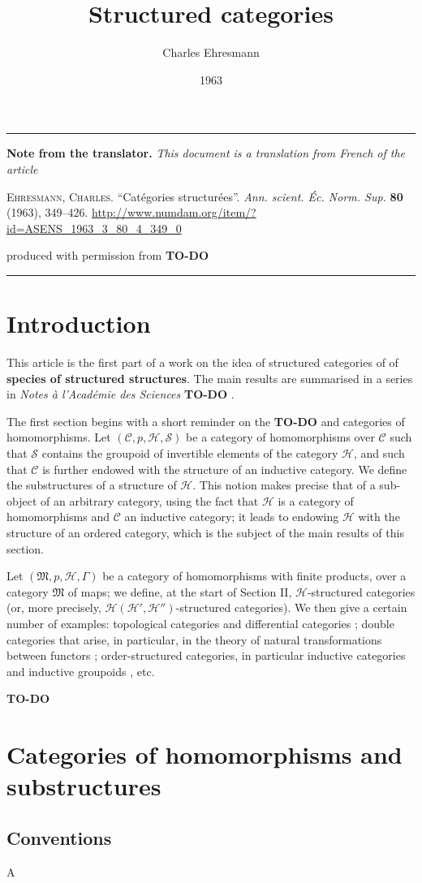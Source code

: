 \documentclass{article}
\title{Structured categories}
\author{Charles Ehresmann}
\date{1963}
\newcommand{\origcit}{%
  \textsc{Ehresmann, Charles.}
  ``Catégories structurées''.
  \emph{Ann. scient. Éc. Norm. Sup.} \textbf{80} (1963), 349--426.
  \url{http://www.numdam.org/item/?id=ASENS_1963_3_80_4_349_0}
}
\newenvironment{itenv}[1]
  {\phantomsection\par\medskip\noindent\textbf{#1.}\itshape}
  {\par\medskip}
\newcommand{\oldpage}[1]{\marginpar{\footnotesize$\Big\vert$ \textit{p.~#1}}}
\newcommand{\todo}{{\color{purple}\textbf{TO-DO }}}
\newcommand{\unsure}[1]{{\color{purple}\textbf{#1}}}
\newcommand{\CC}{\mathcal{C}}
\newcommand{\HH}{\mathcal{H}}
\renewcommand{\SS}{\mathcal{S}}
\newcommand{\MM}{\mathfrak{M}}
\begin{document}
\maketitle

\hrule
\begin{itenv}{Note from the translator}
This document is a translation from French of the article

\medskip
{\normalfont\origcit}

\medskip
produced with permission from \todo
\end{itenv}
\hrule

\tableofcontents


\section*{Introduction}

\oldpage{349}

This article is the first part of a work on the idea of structured categories of of \unsure{species of structured structures}.
The main results are summarised in a series in \emph{Notes à l'Académie des Sciences} \cite{3e}\todo.

The first section begins with a short reminder on the \todo and categories of homomorphisms.
Let $(\CC,p,\HH,\SS)$ be a category of homomorphisms over $\CC$ such that $\SS$ contains the groupoid of invertible elements of the category $\HH$, and such that $\CC$ is further endowed with the structure of an inductive category.
We define the substructures of a structure of $\HH$.
This notion makes precise that of a sub-object of an arbitrary category, using the fact that $\HH$ is a category of homomorphisms and $\CC$ an inductive category;
it leads to endowing $\HH$ with the structure of an ordered category, which is the subject of the main results of this section.

Let $(\MM,p,\HH,\Gamma)$ be a category of homomorphisms with finite products, over a category $\MM$ of maps;
we define, at the start of Section II, $\HH$-structured categories (or, more precisely, $\HH(\HH',\HH'')$-structured categories).
We then give a certain number of examples: topological categories and differential categories \cite{3b}; double categories that arise, in particular, in the theory of natural transformations between functors \cite{3d}; order-structured categories, in particular inductive categories and inductive groupoids \cite{3c}, etc.

\todo


\section{Categories of homomorphisms and substructures}

\subsection{Conventions}

A







\nocite{*}
\printbibliography[heading=bibintoc,title=Bibliography]
\end{document}
